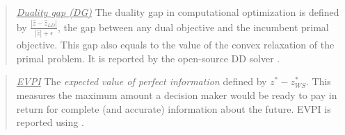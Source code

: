 %

\begin{quote}
\noindent\underline{\textit{Duality gap (DG)}} The duality gap in computational optimization is defined by $\frac{|\hat{z}-\hat{z}_{LD}|}{|\hat{z}|+\epsilon}$, the gap between any dual objective and the incumbent primal objective. This gap also equals to the value of the convex relaxation of the primal problem. It is reported by the open-source DD solver \dsp. 
\end{quote}

\begin{quote}
\noindent\underline{\textit{EVPI}} The \textit{expected value of perfect information} defined by $z^*-z^*_{WS}$. This measures the maximum amount a decision maker would be ready to pay in return for complete (and accurate) information about the future. EVPI is reported using \cplex.
\end{quote}



